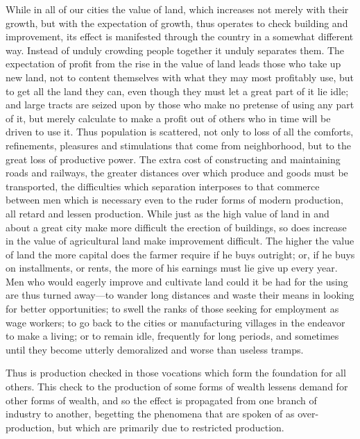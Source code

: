 \documentclass{book}
\begin{document}
While in all of our cities the value of land, which increases not merely with their growth, but with the expectation of growth, thus operates to check building and improvement, its effect is manifested through the country in a somewhat different way. Instead of unduly crowding people together it unduly separates them. The expectation of profit from the rise in the value of land leads those who take up new land, not to content themselves with what they may most profitably use, but to get all the land they can, even though they must let a great part of it lie idle; and large tracts are seized upon by those who make no pretense of using any part of it, but merely calculate to make a profit out of others who in time will be driven to use it. Thus population is scattered, not only to loss of all the comforts, refinements, pleasures and stimulations that come from neighborhood, but to the great loss of productive power. The extra cost of constructing and maintaining roads and railways, the greater distances over which produce and goods must be transported, the difficulties which separation interposes to that commerce between men which is necessary even to the ruder forms of modern production, all retard and lessen production. While just as the high value of land in and about a great city make more difficult the erection of buildings, so does increase in the value of agricultural land make improvement difficult. The higher the value of land the more capital does the farmer require if he buys outright; or, if he buys on installments, or rents, the more of his earnings must lie give up every year. Men who would eagerly improve and cultivate land could it be had for the using are thus turned away—to wander long distances and waste their means in looking for better opportunities; to swell the ranks of those seeking for employment as wage workers; to go back to the cities or manufacturing villages in the endeavor to make a living; or to remain idle, frequently for long periods, and sometimes until they become utterly demoralized and worse than useless tramps.

Thus is production checked in those vocations which form the foundation for all others. This check to the production of some forms of wealth lessens demand for other forms of wealth, and so the effect is propagated from one branch of industry to another, begetting the phenomena that are spoken of as over-production, but which are primarily due to restricted production.
\end{document}
